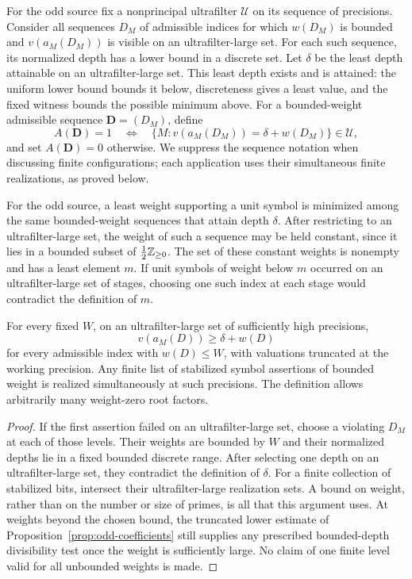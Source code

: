 For the odd source fix a nonprincipal ultrafilter $\mathcal U$ on its
sequence of precisions. Consider all sequences $D_M$ of admissible indices for
which $w(D_M)$ is bounded and $v(a_M(D_M))$ is visible on an
ultrafilter-large set.  For each such sequence, its normalized depth
has a lower bound in a discrete set.  Let $\delta$ be the least depth
attainable on an ultrafilter-large set.  This least depth exists and is
attained: the uniform lower bound bounds it below, discreteness gives
a least value, and the fixed witness bounds the possible minimum above.
For a bounded-weight admissible sequence $\mathbf D=(D_M)$, define
\[
 A(\mathbf D)=1
 \quad\Longleftrightarrow\quad
 \{M:v(a_M(D_M))=\delta+w(D_M)\}\in\mathcal U,
\]
and set $A(\mathbf D)=0$ otherwise. We suppress the sequence notation
when discussing finite configurations; each application uses their
simultaneous finite realizations, as proved below.

For the odd source, a least weight supporting a unit symbol is minimized
among the same bounded-weight sequences that attain depth $\delta$.
After restricting to an ultrafilter-large set, the weight of such a
sequence may be held constant, since it lies in a bounded subset of
$\tfrac12\mathbb Z_{\ge0}$. The set of these constant weights is nonempty and
has a least element $m$. If unit symbols of weight below $m$ occurred
on an ultrafilter-large set of stages, choosing one such index at each
stage would contradict the definition of $m$.

\begin{lemma}
\label{cs:fixed-weight-uniformity}
For every fixed $W$, on an ultrafilter-large set of sufficiently high
precisions,
\[
                   v(a_M(D))\geq\delta+w(D)
\]
for every admissible index with $w(D)\leq W$, with valuations truncated
at the working precision.  Any finite list of stabilized symbol
assertions of bounded weight is realized simultaneously at such
precisions.  The definition allows arbitrarily many weight-zero root
factors.
\end{lemma}

\begin{proof}
If the first assertion failed on an ultrafilter-large set, choose a
violating $D_M$ at each of those levels.  Their weights are bounded by
$W$ and their normalized depths lie in a fixed bounded discrete range.
After selecting one depth on an ultrafilter-large set, they contradict
the definition of $\delta$.  For a finite collection of stabilized
bits, intersect their ultrafilter-large realization sets.  A bound on
weight, rather than on the number or size of primes, is all that this
argument uses.  At weights beyond the chosen bound, the truncated
lower estimate of Proposition~\ref{prop:odd-coefficients} still
supplies any prescribed bounded-depth divisibility test once the weight
is sufficiently large.  No claim of one finite level valid for all
unbounded weights is made.
\end{proof}

